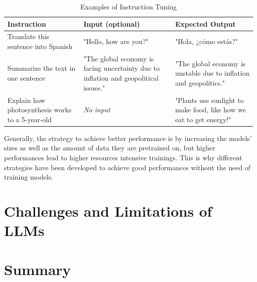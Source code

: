 \begin{table}[b]
    \centering
    \renewcommand{\arraystretch}{1.3}
    \begin{tabularx}{\textwidth}{|X|X|X|}
        \hline
        \textbf{Instruction} & \textbf{Input (optional)} & \textbf{Expected Output} \\
        \hline
        Translate this sentence into Spanish & "Hello, how are you?" & "Hola, ¿cómo estás?" \\
        \hline
        Summarize the text in one sentence & "The global economy is facing uncertainty due to inflation and geopolitical issues." & "The global economy is unstable due to inflation and geopolitics." \\
        \hline
        Explain how photosynthesis works to a 5-year-old & \textit{No input} & "Plants use sunlight to make food, like how we eat to get energy!" \\
        \hline
    \end{tabularx}
    \caption{Examples of Instruction Tuning}
    \label{tab:instruction-tuning}
\end{table}

Generally, the strategy to achieve better performance is by increasing the models’ sizes as well as the amount of data they are pretrained on, but higher performances lead to higher resources intensive trainings. This is why different strategies have been developed to achieve good performances without the need of training models.


\label{sec:key-techniques}


\section{Challenges and Limitations of LLMs}
\label{sec:challenges-llms}


\section{Summary}
\label{sec:background-summary}